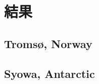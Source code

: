 \chapter{結果}
\label{ch:results}
\section{Troms\o , Norway}
\label{sec:results_tromsoe}
\section{Syowa, Antarctic}
\label{sec:results_syowa}
